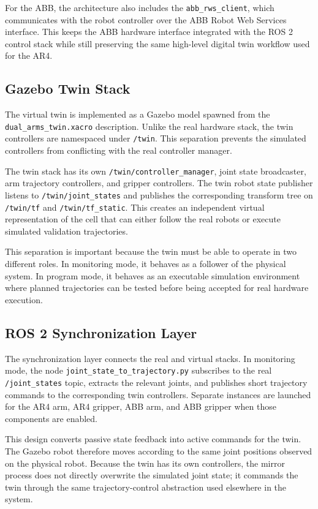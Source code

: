 For the ABB, the architecture also includes the \texttt{abb\_rws\_client}, which communicates with the robot controller over the ABB Robot Web Services interface. This keeps the ABB hardware interface integrated with the ROS 2 control stack while still preserving the same high-level digital twin workflow used for the AR4.

\subsection{Gazebo Twin Stack}

The virtual twin is implemented as a Gazebo model spawned from the \texttt{dual\_arms\_twin.xacro} description. Unlike the real hardware stack, the twin controllers are namespaced under \texttt{/twin}. This separation prevents the simulated controllers from conflicting with the real controller manager.

The twin stack has its own \texttt{/twin/controller\_manager}, joint state broadcaster, arm trajectory controllers, and gripper controllers. The twin robot state publisher listens to \texttt{/twin/joint\_states} and publishes the corresponding transform tree on \texttt{/twin/tf} and \texttt{/twin/tf\_static}. This creates an independent virtual representation of the cell that can either follow the real robots or execute simulated validation trajectories.

This separation is important because the twin must be able to operate in two different roles. In monitoring mode, it behaves as a follower of the physical system. In program mode, it behaves as an executable simulation environment where planned trajectories can be tested before being accepted for real hardware execution.

\subsection{ROS 2 Synchronization Layer}

The synchronization layer connects the real and virtual stacks. In monitoring mode, the node \texttt{joint\_state\_to\_trajectory.py} subscribes to the real \texttt{/joint\_states} topic, extracts the relevant joints, and publishes short trajectory commands to the corresponding twin controllers. Separate instances are launched for the AR4 arm, AR4 gripper, ABB arm, and ABB gripper when those components are enabled.

This design converts passive state feedback into active commands for the twin. The Gazebo robot therefore moves according to the same joint positions observed on the physical robot. Because the twin has its own controllers, the mirror process does not directly overwrite the simulated joint state; it commands the twin through the same trajectory-control abstraction used elsewhere in the system.

